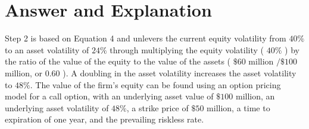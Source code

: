\documentclass[11pt]{article}
\begin{document}
\section*{Answer and Explanation}
Step 2 is based on Equation 4 and unlevers the current equity volatility from $40 \%$ to an asset volatility of $24 \%$ through multiplying the equity volatility ( $40 \%$ ) by the ratio of the value of the equity to the value of the assets ( $\$ 60$ million $/ \$ 100$ million, or 0.60 ). A doubling in the asset volatility increases the asset volatility to $48 \%$. The value of the firm's equity can be found using an option pricing model for a call option, with an underlying asset value of $\$ 100$ million, an underlying asset volatility of $48 \%$, a strike price of $\$ 50$ million, a time to expiration of one year, and the prevailing riskless rate.
\end{document}
